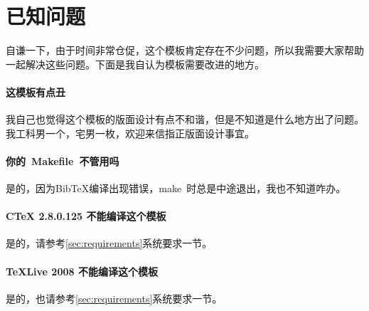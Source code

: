 
\chapter{已知问题}
\label{chap:needsomehelp}

自谦一下，由于时间非常仓促，这个模板肯定存在不少问题，所以我需要大家帮助一起解决这些问题。下面是我自认为模板需要改进的地方。

\subsubsection*{这模板有点丑}
我自己也觉得这个模板的版面设计有点不和谐，但是不知道是什么地方出了问题。我工科男一个，宅男一枚，欢迎来信指正版面设计事宜。

\subsubsection*{你的~Makefile~不管用吗}
是的，因为BibTeX编译出现错误，make~时总是中途退出，我也不知道咋办。

\subsubsection*{CTeX 2.8.0.125 不能编译这个模板}
是的，请参考\ref{sec:requirements}系统要求一节。

\subsubsection*{TeXLive 2008 不能编译这个模板}
是的，也请参考\ref{sec:requirements}系统要求一节。

